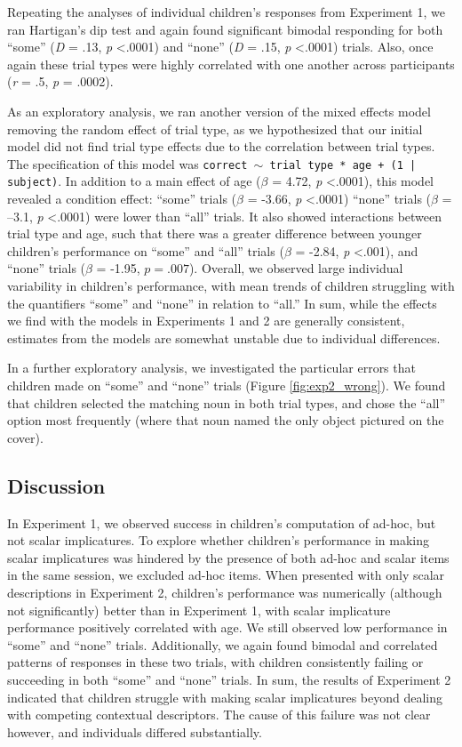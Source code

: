 \documentclass[man]{apa2}
\begin{document}
Repeating the analyses of individual children's responses from Experiment 1, we ran Hartigan's dip test and again found significant bimodal responding for both ``some'' (\textit{D} = .13, \textit{p} \textless  .0001) and ``none'' (\textit{D} = .15, \textit{p} \textless  .0001) trials. Also, once again these trial types were highly correlated with one another across participants (\textit{r} = .5, \textit{p} = .0002).

As an exploratory analysis, we ran another version of the mixed effects model removing the random effect of trial type, as we hypothesized that our initial model did not find trial type effects due to the correlation between trial types. The specification of this model was \texttt{correct $\sim$ trial type * age + (1 | subject)}. In addition to a main effect of age ($\beta$ = 4.72, \textit{p} \textless .0001), this model revealed a condition effect: ``some'' trials ($\beta$ = -3.66, \emph{p} \textless .0001) ``none'' trials ($\beta$ = --3.1, \emph{p} \textless .0001) were lower than ``all'' trials. It also showed interactions between trial type and age, such that there was a greater difference between younger children's performance on ``some'' and ``all'' trials ($\beta$ = -2.84, \textit{p} \textless  .001), and ``none'' trials ($\beta$ = -1.95, $p = .007$). Overall, we observed large individual variability in children's performance, with mean trends of children struggling with the quantifiers ``some'' and ``none'' in relation to ``all.'' In sum, while the effects we find with the models in Experiments 1 and 2 are generally consistent, estimates from the models are somewhat unstable due to individual differences.

In a further exploratory analysis, we investigated the particular errors that children made on ``some'' and ``none'' trials (Figure \ref{fig:exp2_wrong}). We found that children selected the matching noun in both trial types, and chose the ``all'' option most frequently (where that noun named the only object pictured on the cover).

\subsection{Discussion}

In Experiment 1, we observed success in children's computation of ad-hoc, but not scalar implicatures. To explore whether children's performance in making scalar implicatures was hindered by the presence of both ad-hoc and scalar items in the same session, we excluded ad-hoc items. When presented with only scalar descriptions in Experiment 2, children's performance was numerically (although not significantly) better than in Experiment 1, with scalar implicature performance positively correlated with age. We still observed low performance in ``some'' and ``none'' trials. Additionally, we again found bimodal and correlated patterns of responses in these two trials, with children consistently failing or succeeding in both ``some'' and ``none'' trials. In sum, the results of Experiment 2 indicated that children struggle with making scalar implicatures beyond dealing with competing contextual descriptors. The cause of this failure was not clear however, and individuals differed substantially.
\end{document}
